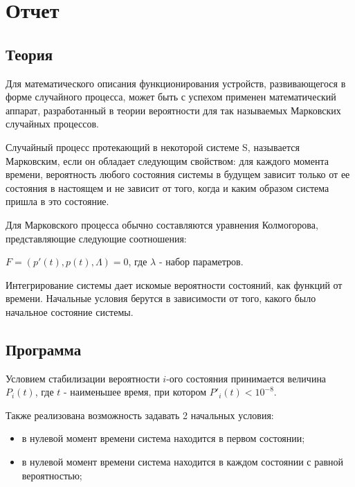 \chapter{Отчет}
\section{Теория}
Для математического описания функционирования устройств, развивающегося в форме случайного процесса, может быть с успехом применен математический аппарат, разработанный в теории вероятности для так называемых Марковских случайных процессов.

Случайный процесс протекающий в некоторой системе S, называется Марковским, если он обладает следующим свойством: для каждого момента времени, вероятность любого состояния системы в будущем зависит только от ее состояния в настоящем и не зависит от того, когда и каким образом система пришла в это состояние.

Для Марковского процесса обычно составляются уравнения Колмогорова, представляющие следующие соотношения:

$F = (p'(t), p(t), \Lambda)=0$, где $\lambda$ - набор параметров.

Интегрирование системы дает искомые вероятности состояний, как функций от времени. Начальные условия берутся в зависимости от того, какого было начальное состояние системы.

\section{Программа}
Условием стабилизации вероятности $i$-ого состояния принимается величина $P_i(t)$, где $t$ - наименьшее время, при котором ${P'}_i(t) < 10^{-8}$. 

Также реализована возможность задавать 2 начальных условия:
\begin{itemize}
	\item в нулевой момент времени система находится в первом состоянии;
	\item в нулевой момент времени система находится в каждом состоянии с равной вероятностью;
\end{itemize}